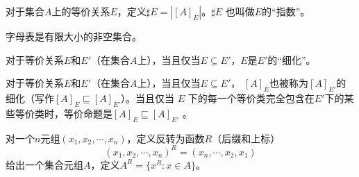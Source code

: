 \begin{definition}[等价类的指数]
    对于集合$A$上的等价关系$E$，定义$\sharp E = | [A]_E |$。$\sharp E$ 也叫做$E$的“指数”。
\end{definition}


\begin{definition}[字母表] \label{def:Alphabat}
    字母表是有限大小的非空集合。
\end{definition}



\begin{definition}[等价关系的细化]
    对于等价关系$E$和$E'$（在集合$A$上），当且仅当$E \subseteq E'$，$E$是$E'$的“细化”。
\end{definition}

\begin{definition}
    对于等价关系$E$和$E'$（在集合$A$上），当且仅当$ E \subseteq E' $， $[A]_E$也被称为$ [A]_{E'} $的细化（写作$ [A]_E \sqsubseteq [A]_{E'} $）。当且仅当 $E$ 下的每一个等价类完全包含在$E'$下的某些等价类时，等价命题是$ [A]_E \sqsubseteq [A]_{E'} $ 。
\end{definition}


\begin{definition}[元组和关系反转]
    对一个$n$元组$(x_1,x_2,\cdots,x_n)$，定义反转为函数$R$（后缀和上标）
    $$ (x_1,x_2,\cdots,x_n)^R = (x_n,\cdots,x_2,x_1) $$
给出一个集合元组$A$，定义$A^R = \{ x^R:x\in A \}$。
\end{definition}


